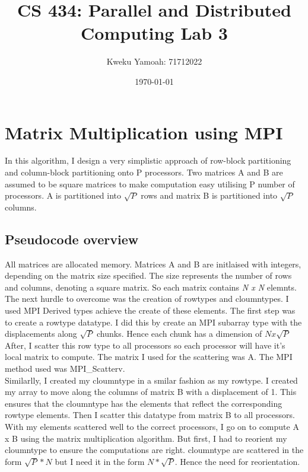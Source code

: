 \documentclass[12pt, a4paper, fleqn, titlepage]{article}
\title{\textbf{CS 434: Parallel and Distributed Computing Lab 3}}
\author{Kweku Yamoah: 71712022}
\date{\today}
\begin{document}
\maketitle



\newpage
\section{Matrix Multiplication using MPI}
In this algorithm, I design a very simplistic approach of row-block partitioning and column-block partitioning onto P processors. Two matrices A and B are assumed to be square matrices to make computation easy utilising P number of processors. A is partitioned into $\sqrt{P}$ rows and matrix B is partitioned into $\sqrt{P}$ columns.\\
\subsection{Pseudocode overview}

All matrices are allocated memory. Matrices A and B are initlaised with integers, depending on the matrix size specified. The size represents the number of rows and columns, denoting a square matrix. So each matrix contains \emph{N x N} elemnts. \\

The next hurdle to overcome was the creation of rowtypes and cloumntypes. I used MPI Derived types achieve the create of these elements. The first step was to create a rowtype datatype. I did this by create an MPI subarray type with the displacements along $\sqrt{P}$ chunks. Hence each chunk has a dimension of $N x \sqrt{P}$\\

After, I scatter this row type to all processors so each processor will have it's local matrix to compute. The matrix I used for the scattering was A. The MPI method used was MPI\_Scatterv.\\

Similarlly, I created my cloumntype in a smilar fashion as my rowtype. I created my array to move along the columns of matrix B with a displacement of 1. This ensures that the cloumntype has the elements that reflect the corresponding rowtype elements. Then I scatter this datatype from matrix B to all processors.\\

With my elements scattered well to the correct processors, I go on to compute A x B using the matrix multiplication algorithm. But first, I had to reorient my cloumntype to ensure the computations are right. cloumntype are scattered in the form \emph{$\sqrt{P} * N$} but I need it in the form \emph{$N * \sqrt{P} $}. Hence the need for reorientation. \\
\end{document}
